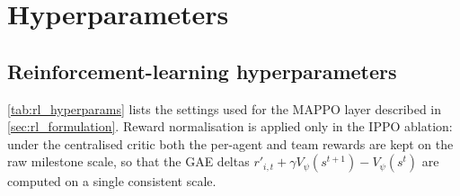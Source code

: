 \section{Hyperparameters}
\label{sec:hyperparams}

\subsection{Reinforcement-learning hyperparameters}
\label{sec:rl_hyperparams}

\autoref{tab:rl_hyperparams} lists the settings used for the MAPPO layer described in \autoref{sec:rl_formulation}. Reward normalisation is applied only in the IPPO ablation: under the centralised critic both the per-agent and team rewards are kept on the raw milestone scale, so that the GAE deltas $r'_{i,t}+\gamma V_\psi(s^{t+1})-V_\psi(s^t)$ are computed on a single consistent scale.

